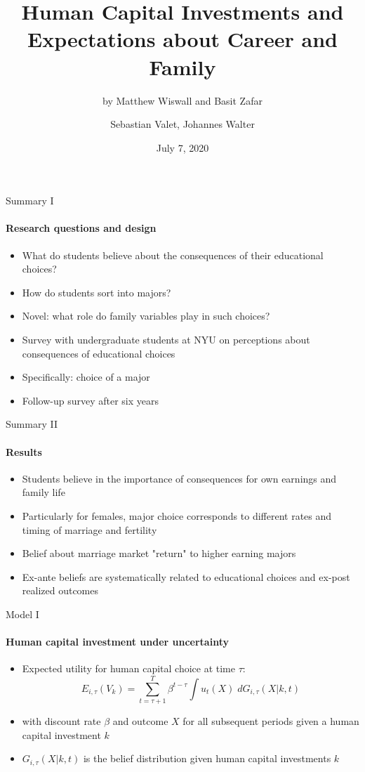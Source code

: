\documentclass[12pt]{beamer}
\author{Sebastian Valet, Johannes Walter}
\title{Human Capital Investments and Expectations about Career and Family}
\subtitle{by Matthew Wiswall and Basit Zafar}
\institute{ZEW Summercourse Revealed Preferences}
\date{July 7, 2020}
\begin{document}
\begin{frame}
\titlepage
\end{frame}


\begin{frame}{Summary I}
    \framesubtitle{Research questions and design}
        \begin{itemize}
            \item What do students believe about the consequences of their educational choices?
            \item How do students sort into majors?
            \item Novel: what role do family variables play in such choices?
        \end{itemize}
    \vspace{0.5cm}
        \begin{itemize}
            \item Survey with undergraduate students at NYU on perceptions about consequences of educational choices
            \item Specifically: choice of a major
            \item Follow-up survey after six years
        \end{itemize}
\end{frame}

\begin{frame}{Summary II}
    \framesubtitle{Results}
    \begin{itemize}
        \item Students believe in the importance of consequences for own earnings and family life
        \item Particularly for females, major choice corresponds to different rates and timing of marriage and fertility
        \item Belief about marriage market "return" to higher earning majors
        \item Ex-ante beliefs are systematically related to educational choices and ex-post realized outcomes
    \end{itemize}
\end{frame}

\begin{frame}{Model I}
    \framesubtitle{Human capital investment under uncertainty}
    \begin{itemize}
        \item Expected utility for human capital choice at time $\tau$: 
        $$ E_{i,\tau}(V_k) = \sum_{t = \tau + 1}^{T} \beta^{t - \tau}  \int u_t(X) \; dG_{i,\tau}(X|k,t) $$
        \item with discount rate $\beta$ and outcome $X$ for all subsequent periods given a human capital investment $k$
        \item $G_{i,\tau}(X|k,t)$ is the belief distribution given human capital investments $k$
    \end{itemize}   
\end{frame}
\end{document}
